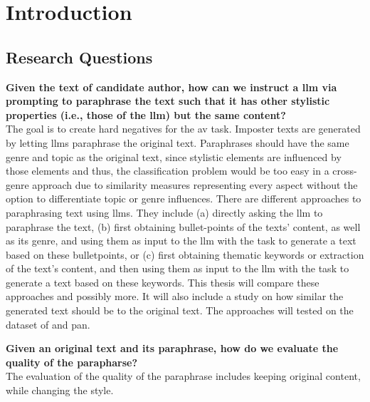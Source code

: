 \chapter{Introduction}
\label{chap:introduction}





\section*{Research Questions}
\label{sec:research_questions}

\begin{questions}
    \item \textbf{Given the text of candidate author, how can we instruct a \ac{llm} via prompting to paraphrase the text such that it has other stylistic properties (i.e., those of the \ac{llm}) but the same content?} \label{enum:rq1} \hfill \\
    The goal is to create hard negatives for the \ac{av} task.
    Imposter texts are generated by letting \acp{llm} paraphrase the original text.
    Paraphrases should have the same genre and topic as the original text, 
    since stylistic elements are influenced by those elements and thus, 
    the classification problem would be too easy in a cross-genre approach 
    due to similarity measures representing every aspect without the option to differentiate topic or genre influences.
    There are different approaches to paraphrasing text using \acp{llm}.
    They include (a) directly asking the \ac{llm} to paraphrase the text, 
    (b) first obtaining bullet-points of the texts' content, as well as its genre, and using them as input to the \ac{llm} with the task to generate a text based on these bulletpoints, 
    or (c) first obtaining thematic keywords or extraction of the text's content, and then using them as input to the \ac{llm} with the task to generate a text based on these keywords.
    This thesis will compare these approaches and possibly more.
    It will also include a study on how similar the generated text should be to the original text.
    The approaches will tested on the dataset of \citet{koppel_determining_2014} and \ac{pan}.

    \item \textbf{Given an original text and its paraphrase, how do we evaluate the quality of the parapharse?} \label{enum:rq2} \hfill \\
    The evaluation of the quality of the paraphrase includes keeping original content, while changing the style.


\end{questions}

